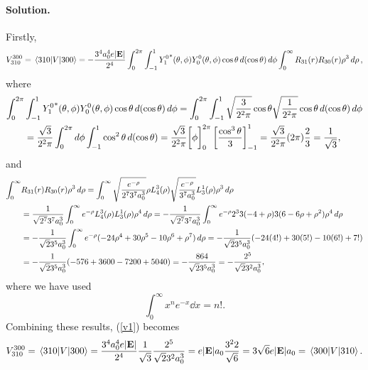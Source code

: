 \documentclass[11pt]{article}
\newcommand{\refeq}[1]{(\ref{#1})}
\newcommand{\beq}{\begin{equation*}}
\newcommand{\eeq}{\end{equation*}}
\newcommand{\beqn}{\begin{equation}}
\newcommand{\eeqn}{\end{equation}}
\newenvironment{solution}
{
    \paragraph{Solution.}
    \ignorespaces
}
{
}
\begin{document}
\begin{solution}
	Firstly,
	\beqn \label{v1}
		V_{3 1 0}^{3 0 0} = \mel{3 1 0}{V}{3 0 0}
		= -\frac{3^4 \ao^4 e |\vE|}{2^4} \int_0^{2\pi} \int_{-1}^1 {Y_1^0}^*(\tht, \phi) Y_0^0(\tht, \phi) \cos\tht \dcost \dphi \int_0^\infty R_{3 1}(r) R_{3 0}(r) \rho^3 \drho,
	\eeqn
	where
	\begin{align*}
		\int_0^{2\pi} &\int_{-1}^1 {Y_1^0}^*(\theta, \phi) Y_0^0(\theta, \phi) \cos\theta \dd{(\cos\theta)} \dd{\phi}
		= \int_0^{2\pi} \int_{-1}^1 \sqrt{\frac{3}{2^2 \pi}} \cos\theta \sqrt{\frac{1}{2^2 \pi}} \cos\theta \dd{(\cos\theta)} \dd{\phi} \\
		&= \frac{\sqrt{3}}{2^2 \pi} \int_0^{2\pi} \dd{\phi} \int_{-1}^1 \cos^2\theta \dd{(\cos\theta)}
		= \frac{\sqrt{3}}{2^2 \pi} \bigg[ \phi \bigg]_0^{2\pi} \left[ \frac{\cos^3\theta}{3} \right]_{-1}^1
		= \frac{\sqrt{3}}{2^2 \pi} (2 \pi) \frac{2}{3}
		= \frac{1}{\sqrt{3}},
	\end{align*}
	and
	\begin{align*}
		\int_0^\infty &R_{3 1}(r) R_{3 0}(r) \rho^3 \dd{\rho}
		= \int_0^\infty \sqrt{\frac{e^{-\rho}}{2^7 3^7 a_0^3}} \rho L_4^3(\rho) \sqrt{\frac{e^{-\rho}}{3^7 a_0^3}} L_3^1(\rho) \rho^3 \dd{\rho} \\
		&= \frac{1}{\sqrt{2^7} 3^7 a_0^3} \int_0^\infty e^{-\rho} L_4^3(\rho) L_3^1(\rho) \rho^4 \dd{\rho}
		= -\frac{1}{\sqrt{2^7} 3^7 a_0^3} \int_0^\infty e^{-\rho} 2^3 3 (-4 + \rho) 3 (6 - 6 \rho + \rho^2) \rho^4 \dd{\rho} \\
		&= -\frac{1}{\sqrt{2} 3^5 a_0^3} \int_0^\infty e^{-\rho} (-24 \rho^4 + 30 \rho^5 - 10 \rho^6 + \rho^7) \dd{\rho}
		= -\frac{1}{\sqrt{2} 3^5 a_0^3} (-24 (4!) + 30 (5!) - 10 (6!) + 7!) \\
		&= -\frac{1}{\sqrt{2} 3^5 a_0^3} (-576 + 3600 - 7200 + 5040)
		= -\frac{864}{\sqrt{2} 3^5 a_0^3}
		= -\frac{2^5}{\sqrt{2} 3^2 a_0^3},
	\end{align*}
	where we have used
	\beq
		\int_0^\infty x^n e^{-x} \dd{x} = n!.
	\eeq
	Combining these results, \refeq{v1} becomes
	\beq
		V_{3 1 0}^{3 0 0} = \mel{3 1 0}{V}{3 0 0}
		= \frac{3^4 \ao^4 e |\vE|}{2^4} \frac{1}{\sqrt{3}} \frac{2^5}{\sqrt{2} 3^2 \ao^3}
		= e |\vE| \ao \frac{3^2 2}{\sqrt{6}}
		= 3 \sqrt{6} e |\vE| \ao
		= \mel{3 0 0}{V}{3 1 0}.
	\eeq
	

\end{solution}
\end{document}
